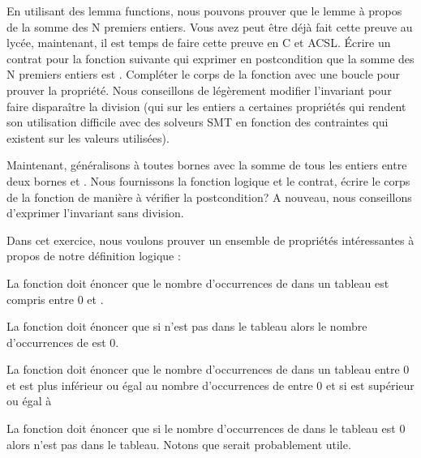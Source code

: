 



En utilisant des lemma functions, nous pouvons prouver que le lemme à propos de
la somme des N premiers entiers. Vous avez peut être déjà fait cette preuve au
lycée, maintenant, il est temps de faire cette preuve en C et ACSL. Écrire un
contrat pour la fonction suivante qui exprimer en postcondition que la somme des
N premiers entiers est . Compléter le corps de la fonction
avec une boucle pour prouver la propriété. Nous conseillons de légèrement modifier
l'invariant pour faire disparaître la division (qui sur les entiers a certaines
propriétés qui rendent son utilisation difficile avec des solveurs SMT en fonction
des contraintes qui existent sur les valeurs utilisées). 




Maintenant, généralisons à toutes bornes avec la somme de tous les entiers entre
deux bornes  et . Nous fournissons la fonction
logique et le contrat, écrire le corps de la fonction de manière à vérifier la
postcondition? A nouveau, nous conseillons d'exprimer l'invariant sans division.






Dans cet exercice, nous voulons prouver un ensemble de propriétés intéressantes
à propos de notre définition logique  :




La fonction  doit énoncer que le nombre d'occurrences
de  dans un tableau est compris entre 0 et .


La fonction  doit énoncer que si 
n'est pas dans le tableau alors le nombre d'occurrences de  est 0.


La fonction  doit énoncer que le nombre d'occurrences
de  dans un tableau entre 0 et  est plus inférieur
ou égal au nombre d'occurrences de  entre 0 et  si
 est supérieur ou égal à 


La fonction  doit énoncer que si le nombre 
d'occurrences de  dans le tableau est 0 alors  n'est
pas dans le tableau. Notons que  serait probablement
utile.


